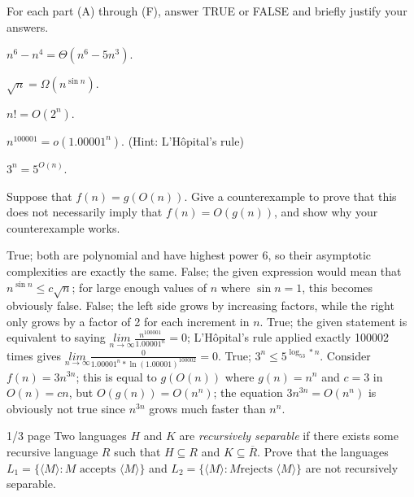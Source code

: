 \documentclass[solution, letterpaper]{cs121}
\begin{document}



For each part (A) through (F), answer TRUE or FALSE and briefly justify your answers.

\subproblem $n^6 - n^4 = \Theta(n^6 - 5n^3)$.

\subproblem $\sqrt{n} = \Omega(n^{\sin{n}})$.

\subproblem $n! = O(2^n)$.

\subproblem $n^{100001}=o(1.00001^n)$. (Hint: L'H\^opital's rule)

\subproblem $3^n=5^{O(n)}$.

\subproblem Suppose that $f(n) = g(O(n))$. Give a counterexample to prove that this does not necessarily imply that $f(n) = O(g(n))$, and show why your counterexample works.


\begin{solution}
\subsolution True; both are polynomial and have highest power 6, so their asymptotic complexities are exactly the same.
\subsolution False; the given expression would mean that $n^{\sin n} \leq c\sqrt{n}$; for large enough values of $n$ where $\sin n = 1$, this becomes obviously false.
\subsolution False; the left side grows by increasing factors, while the right only grows by a factor of 2 for each increment in $n$.
\subsolution True; the given statement is equivalent to saying $\underset{n\rightarrow \infty}{lim} \frac{n^{100001}}{1.00001^n} = 0$; L'H\^opital's rule applied exactly 100002 times gives $\underset{n \rightarrow \infty}{lim} \frac{0}{1.00001^n * \ln(1.00001)^{100002}} = 0$.
\subsolution True; $3^n \leq 5^{\log_53 * n}$.
\subsolution Consider $f(n) = 3n^{3n}$; this is equal to $g(O(n))$ where $g(n) = n^n$ and $c = 3$ in $O(n) = cn$, but $O(g(n)) = O(n^n)$; the equation $3n^{3n} = O(n^n)$ is obviously not true since $n^{3n}$ grows much faster than $n^n$.
\end{solution}


 {1/3 page}
Two languages $H$ and $K$ are \emph{recursively separable} if there
exists some recursive language $R$ such that $H \subseteq R$ and
$K \subseteq \overline{R}$.  Prove that the languages $L_1 =
\{\langle M \rangle : M  \mbox{ accepts } \langle M \rangle\}$ and
$L_2 = \{\langle M \rangle: M \mbox{
rejects } \langle M \rangle \}$ are not recursively separable.
\end{document}
